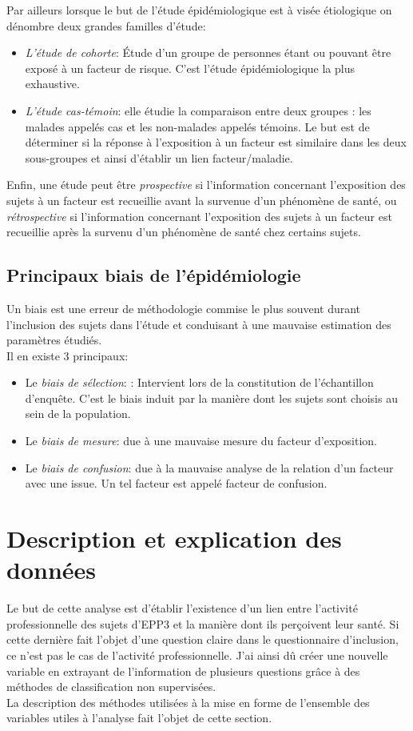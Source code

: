 \documentclass{book}
\begin{document}
\bigskip

\noindent
Par ailleurs lorsque le but de l'étude épidémiologique est à visée étiologique on dénombre deux grandes familles d'étude:
\begin{itemize}
\item \textit{L'étude de cohorte}: Étude d'un groupe de personnes étant ou pouvant être exposé à un facteur de risque. C'est l'étude épidémiologique la plus exhaustive.
\item \textit{L'étude cas-témoin}: elle étudie la comparaison entre deux groupes : les malades appelés cas et les non-malades appelés témoins. Le but est de déterminer si la réponse à l'exposition à un facteur est similaire dans les deux sous-groupes et ainsi d'établir un lien facteur/maladie.
\end{itemize}

\bigskip

\noindent
Enfin, une étude peut être \textit{prospective} si  l'information concernant l'exposition des sujets à un facteur est recueillie avant la survenue d'un phénomène de  santé, ou \textit{rétrospective} si l'information concernant l'exposition des sujets à un facteur est recueillie après  la survenu d'un phénomène de  santé chez certains sujets.

\subsection{Principaux biais de l'épidémiologie}
\noindent
Un biais est une erreur de méthodologie commise le plus souvent durant l'inclusion des sujets dans l'étude et conduisant à une mauvaise estimation des paramètres étudiés.\\

\noindent
Il en existe 3 principaux:
\begin{itemize}
\item Le \textit{biais de sélection}: : Intervient lors de la constitution de l'échantillon d'enquête. C'est le biais induit par la manière dont les sujets sont choisis au sein de la population. 
\item Le \textit{biais de mesure}: due à une mauvaise mesure du facteur d'exposition.
\item Le \textit{biais de confusion}: due à la mauvaise analyse de la relation d'un facteur avec une issue. Un tel facteur est appelé facteur de confusion.
\end{itemize}

\section{Description et explication des données}
\noindent
Le but de cette analyse est d'établir l'existence d'un lien entre l'activité professionnelle des sujets d'EPP3 et la manière dont ils perçoivent leur santé. Si cette dernière fait l'objet d'une question claire dans le questionnaire d'inclusion, ce n'est pas le cas de l'activité professionnelle. J'ai ainsi dû créer une nouvelle variable en extrayant de l'information de plusieurs questions grâce à des méthodes de classification non supervisées.\\
La description des méthodes utilisées à la mise en forme de l'ensemble des variables utiles à l'analyse fait l'objet de cette section.
\end{document}
